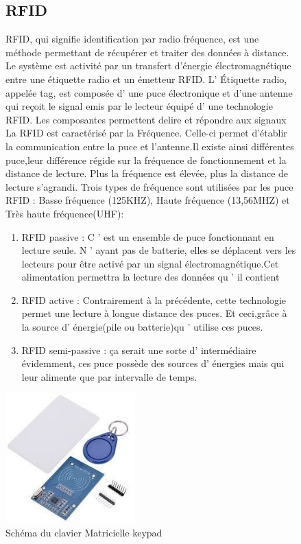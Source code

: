 \documentclass[12pt, openany]{report}
\begin{document}
 \begin{figure}[!h]
                 \centering
 \subsection{RFID}
 RFID, qui signifie identification par radio fréquence, est une méthode permettant de récupérer et traiter des données à distance. Le système est activité par un transfert d’énergie électromagnétique entre une étiquette radio et un émetteur RFID. L' Étiquette radio, appelée tag, est composée d’ une puce électronique et d’une antenne qui reçoit le signal emis par le lecteur équipé d’ une technologie RFID. Les composantes permettent delire et répondre aux signaux
  La RFID est caractérisé par la Fréquence. Celle-ci permet d’établir la communication entre la puce et l’antenne.Il existe ainsi différentes puce,leur différence régide sur la fréquence de fonctionnement et la distance de lecture. Plus la fréquence est élevée, plus la distance de lecture s’agrandi. Trois types de fréquence sont utilisées par les puce RFID : Basse fréquence (125KHZ), Haute fréquence (13,56MHZ) et Très haute fréquence(UHF):
  \begin{enumerate}
  \item  RFID passive : C ’ est un ensemble de puce fonctionnant en lecture seule. N ’ ayant pas de batterie, elles se déplacent vers les lecteurs pour être activé par un signal électromagnétique.Cet alimentation permettra la lecture des données qu ’ il contient
  \item  RFID active : Contrairement à la précédente, cette technologie permet une lecture à longue distance des puces. Et ceci,grâce à la source d’ énergie(pile ou batterie)qu ’ utilise ces puces. 
  \item  RFID semi-passive : ça serait une sorte d’ intermédiaire évidemment, ces puce possède des sources d’ énergies mais qui leur alimente que par intervalle de temps.
  
  \end{enumerate} 
 
 \includegraphics[height=5cm,width=5cm]{composantes/rfid.png} 
          \caption{Schéma du clavier Matricielle keypad}
               		          		
 \end{figure}
\end{document}
